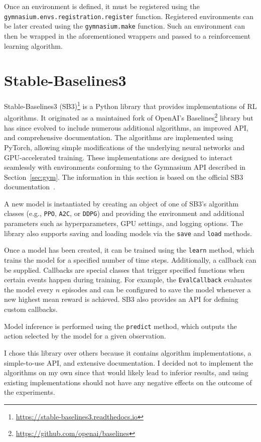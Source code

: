 \documentclass[
  digital,     %
  oneside,     %
  nosansbold,  %
  nocolorbold, %
  lof,         %
  lot,         %
]{fithesis4}
\begin{document}
Once an environment is defined, it must be registered using the \texttt{gymnasium.envs.registration.register} function. Registered environments can be later created using the \texttt{gymnasium.make} function. Such an environment can then be wrapped in the aforementioned wrappers and passed to a reinforcement learning algorithm.

\section{Stable-Baselines3}
Stable-Baselines3 (SB3)\footnote{\url{https://stable-baselines3.readthedocs.io}} is a Python library that provides implementations of RL algorithms. It originated as a maintained fork of OpenAI's Baselines\footnote{\url{https://github.com/openai/baselines}} library but has since evolved to include numerous additional algorithms, an improved API, and comprehensive documentation. The algorithms are implemented using PyTorch, allowing simple modifications of the underlying neural networks and GPU-accelerated training. These implementations are designed to interact seamlessly with environments conforming to the Gymnasium API described in Section~\ref{sec:gym}. The information in this section is based on the official SB3 documentation~\cite{SB3-docs}.

A new model is instantiated by creating an object of one of SB3’s algorithm classes (e.g., \texttt{PPO}, \texttt{A2C}, or \texttt{DDPG}) and providing the environment and additional parameters such as hyperparameters, GPU settings, and logging options. The library also supports saving and loading models via the \texttt{save} and \texttt{load} methods.

Once a model has been created, it can be trained using the \texttt{learn} method, which trains the model for a specified number of time steps. Additionally, a callback can be supplied. Callbacks are special classes that trigger specified functions when certain events happen during training. For example, the \texttt{EvalCallback} evaluates the model every $n$ episodes and can be configured to save the model whenever a new highest mean reward is achieved. SB3 also provides an API for defining custom callbacks.

Model inference is performed using the \texttt{predict} method, which outputs the action selected by the model for a given observation.

I chose this library over others because it contains algorithm implementations, a simple-to-use API, and extensive documentation. I decided not to implement the algorithms on my own since that would likely lead to inferior results, and using existing implementations should not have any negative effects on the outcome of the experiments.
\end{document}
